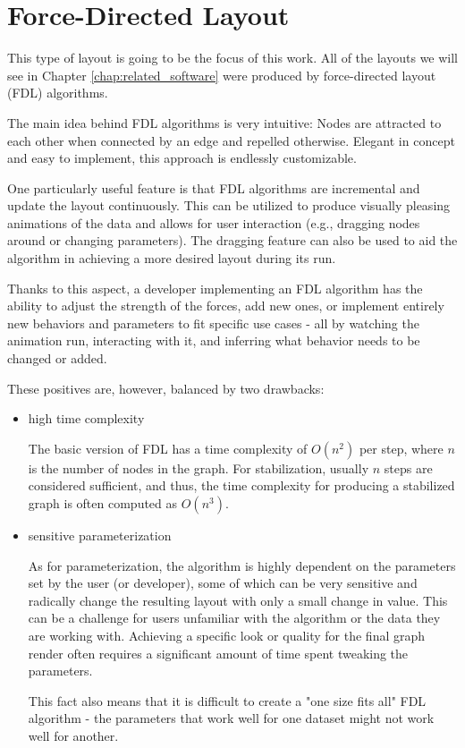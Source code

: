 \section{Force-Directed Layout}
\label{sec:force_directed_layout}

This type of layout is going to be the focus of this work.
All of the layouts we will see in Chapter \ref{chap:related_software} were produced by force-directed layout (FDL) algorithms.

The main idea behind FDL algorithms is very intuitive:
Nodes are attracted to each other when connected by an edge and repelled otherwise.
Elegant in concept and easy to implement, this approach is endlessly customizable.

One particularly useful feature is that FDL algorithms are incremental and update the layout continuously.
This can be utilized to produce visually pleasing animations of the data and allows for user interaction
(e.g., dragging nodes around or changing parameters).
The dragging feature can also be used to aid the algorithm in achieving a more desired layout during its run.

Thanks to this aspect, a developer implementing an FDL algorithm has the ability to adjust the strength of the forces, add new ones,
or implement entirely new behaviors and parameters to fit specific use cases 
- all by watching the animation run, interacting with it, and inferring what behavior needs to be changed or added.

These positives are, however, balanced by two drawbacks:
\begin{itemize}
    \item high time complexity

 The basic version of FDL has a time complexity of $O(n^2)$ per step, where $n$ is the number of nodes in the graph.
 For stabilization, usually $n$ steps are considered sufficient,
 and thus, the time complexity for producing a stabilized graph is often computed as $O(n^3)$.

    \item sensitive parameterization
    
 As for parameterization, the algorithm is highly dependent on the parameters set by the user (or developer),
 some of which can be very sensitive and radically change the resulting layout with only a small change in value.
 This can be a challenge for users unfamiliar with the algorithm or the data they are working with.
 Achieving a specific look or quality for the final graph render often requires a significant amount of time spent tweaking the parameters.

 This fact also means that it is difficult to create a "one size fits all" FDL algorithm
 - the parameters that work well for one dataset might not work well for another.
\end{itemize}